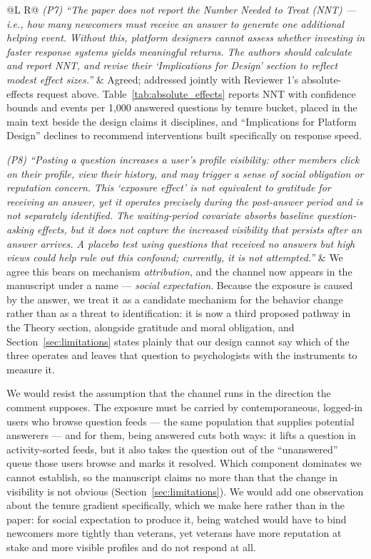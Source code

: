 \documentclass[11pt]{article}
\begin{document}
\begin{longtable}{@{}L R@{}}
\textit{(P7) ``The paper does not report the Number Needed to Treat (NNT) --- i.e., how many newcomers must receive an answer to generate one additional helping event. Without this, platform designers cannot assess whether investing in faster response systems yields meaningful returns. The authors should calculate and report NNT, and revise their `Implications for Design' section to reflect modest effect sizes.''} &
Agreed; addressed jointly with Reviewer 1's absolute-effects request above. Table~\ref{tab:absolute_effects} reports NNT with confidence bounds and events per 1{,}000 answered questions by tenure bucket, placed in the main text beside the design claims it disciplines, and ``Implications for Platform Design'' declines to recommend interventions built specifically on response speed. \\
\midrule

\textit{(P8) ``Posting a question increases a user's profile visibility: other members click on their profile, view their history, and may trigger a sense of social obligation or reputation concern. This `exposure effect' is not equivalent to gratitude for receiving an answer, yet it operates precisely during the post-answer period and is not separately identified. The waiting-period covariate absorbs baseline question-asking effects, but it does not capture the increased visibility that persists after an answer arrives. A placebo test using questions that received no answers but high views could help rule out this confound; currently, it is not attempted.''} &
We agree this bears on mechanism \emph{attribution}, and the channel now appears in the manuscript under a name --- \emph{social expectation}. Because the exposure is caused by the answer, we treat it as a candidate mechanism for the behavior change rather than as a threat to identification: it is now a third proposed pathway in the Theory section, alongside gratitude and moral obligation, and Section~\ref{sec:limitations} states plainly that our design cannot say which of the three operates and leaves that question to psychologists with the instruments to measure it.

We would resist the assumption that the channel runs in the direction the comment supposes. The exposure must be carried by contemporaneous, logged-in users who browse question feeds --- the same population that supplies potential answerers --- and for them, being answered cuts both ways: it lifts a question in activity-sorted feeds, but it also takes the question out of the ``unanswered'' queue those users browse and marks it resolved. Which component dominates we cannot establish, so the manuscript claims no more than that the change in visibility is not obvious (Section~\ref{sec:limitations}). We would add one observation about the tenure gradient specifically, which we make here rather than in the paper: for social expectation to produce it, being watched would have to bind newcomers more tightly than veterans, yet veterans have more reputation at stake and more visible profiles and do not respond at all.


\end{longtable}
\end{document}
